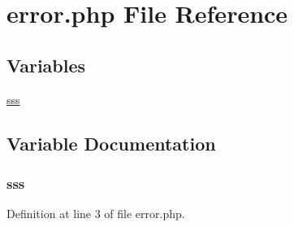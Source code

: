 \hypertarget{error_8php}{\section{error.\+php File Reference}
\label{error_8php}
}
\subsection*{Variables}
\begin{DoxyCompactItemize}
\item 
\hyperlink{error_8php_aaf15d5fdacd5fdfea300e88a8e253e82}{sss}
\end{DoxyCompactItemize}


\subsection{Variable Documentation}
\hypertarget{error_8php_aaf15d5fdacd5fdfea300e88a8e253e82}{
\subsubsection[{sss}]{\setlength{\rightskip}{0pt plus 5cm}sss}}\label{error_8php_aaf15d5fdacd5fdfea300e88a8e253e82}


Definition at line 3 of file error.\+php.

